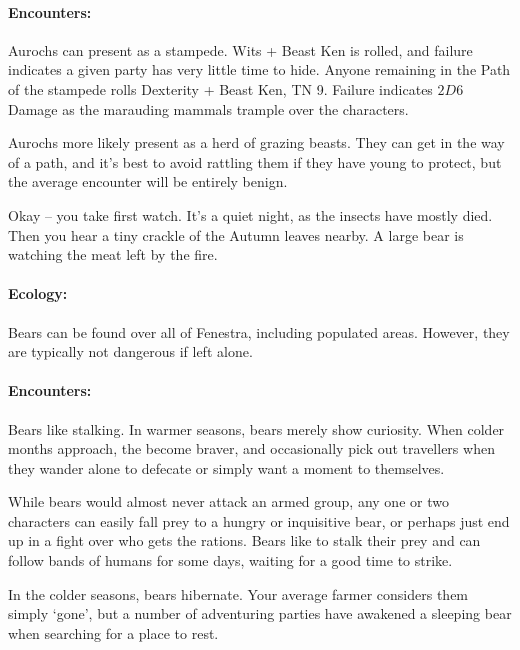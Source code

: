 \begin{multicols}{2}
\paragraph{Encounters:} Aurochs can present as a stampede.  Wits + Beast Ken is rolled, and failure indicates a given party has very little time to hide.  Anyone remaining in the Path of the stampede rolls Dexterity + Beast Ken, TN 9.  Failure indicates $2D6$ Damage as the marauding mammals trample over the characters.

Aurochs more likely present as a herd of grazing beasts.  They can get in the way of a path, and it's best to avoid rattling them if they have young to protect, but the average encounter will be entirely benign.

\label{bear}

\bear

\begin{boxtext}

	Okay -- you take first watch.  It's a quiet night, as the insects have mostly died.  Then you hear a tiny crackle of the Autumn leaves nearby.  A large bear is watching the meat left by the fire.

\end{boxtext}

\paragraph{Ecology:} Bears can be found over all of Fenestra, including populated areas.  However, they are typically not dangerous if left alone.

\paragraph{Encounters:} Bears like stalking.  In warmer seasons, bears merely show curiosity.  When colder months approach, the become braver, and occasionally pick out travellers when they wander alone to defecate or simply want a moment to themselves.

While bears would almost never attack an armed group, any one or two characters can easily fall prey to a hungry or inquisitive bear, or perhaps just end up in a fight over who gets the rations.  Bears like to stalk their prey and can follow bands of humans for some days, waiting for a good time to strike.

In the colder seasons, bears hibernate.  Your average farmer considers them simply `gone', but a number of adventuring parties have awakened a sleeping bear when searching for a place to rest.


\end{multicols}
